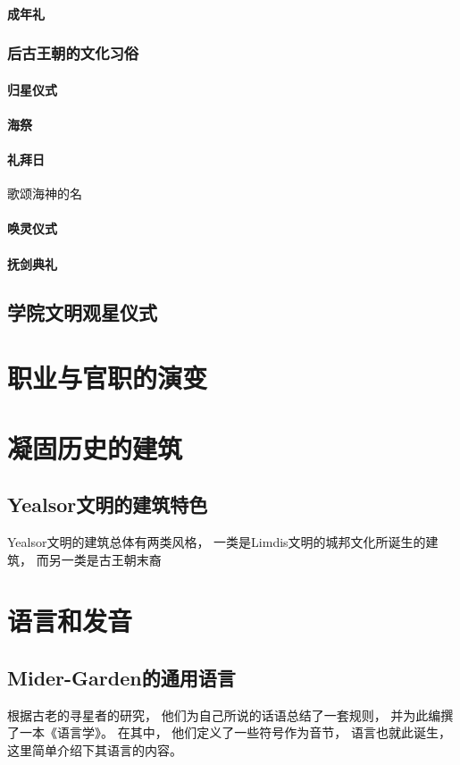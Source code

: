 \documentclass[UTF8,12pt,draft]{ctexbook}
\begin{document}
                \subsubsection{成年礼}
            \subsection{后古王朝的文化习俗}
                \subsubsection{归星仪式}
                \subsubsection{海祭}
                \subsubsection{礼拜日}
                    歌颂海神的名
                \subsubsection{唤灵仪式}
                \subsubsection{抚剑典礼}
        \section{学院文明观星仪式}
    \chapter{职业与官职的演变}
    \chapter{凝固历史的建筑}
    	\section{Yealsor文明的建筑特色}
            Yealsor文明的建筑总体有两类风格，
            一类是Limdis文明的城邦文化所诞生的建筑，
            而另一类是古王朝末裔
    \chapter{语言和发音}
        \section{Mider-Garden的通用语言}
            根据古老的寻星者的研究，
            他们为自己所说的话语总结了一套规则，
            并为此编撰了一本《语言学》。
            在其中，
            他们定义了一些符号作为音节，
            语言也就此诞生，
            这里简单介绍下其语言的内容。
\end{document}
